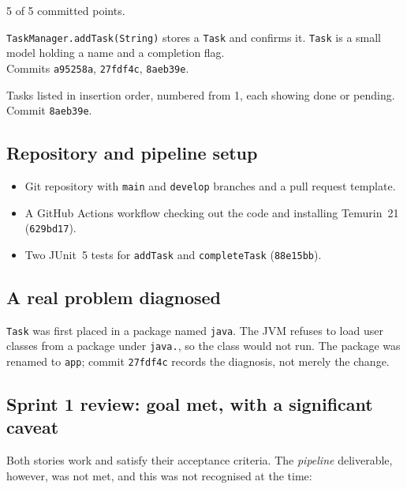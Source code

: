 \documentclass[11pt,a4paper]{article}
\newcommand{\code}[1]{\texttt{\small #1}}
\begin{document}
5 of 5 committed points.

\begin{description}[leftmargin=0pt,style=nextline]
  \item[US1 --- Add a task] \code{TaskManager.addTask(String)} stores a
    \code{Task} and confirms it. \code{Task} is a small model holding a name and
    a completion flag. \\ Commits \code{a95258a}, \code{27fdf4c}, \code{8aeb39e}.
  \item[US2 --- View tasks] Tasks listed in insertion order, numbered from 1,
    each showing done or pending. \\ Commit \code{8aeb39e}.
\end{description}

\subsection{Repository and pipeline setup}

\begin{itemize}
  \item Git repository with \code{main} and \code{develop} branches and a pull
        request template.
  \item A GitHub Actions workflow checking out the code and installing
        Temurin~21 (\code{629bd17}).
  \item Two JUnit~5 tests for \code{addTask} and \code{completeTask}
        (\code{88e15bb}).
\end{itemize}

\subsection{A real problem diagnosed}

\code{Task} was first placed in a package named \code{java}. The JVM refuses to
load user classes from a package under \code{java.}, so the class would not run.
The package was renamed to \code{app}; commit \code{27fdf4c} records the
diagnosis, not merely the change.

\subsection{Sprint 1 review: goal met, with a significant caveat}

Both stories work and satisfy their acceptance criteria. The \emph{pipeline}
deliverable, however, was not met, and this was not recognised at the time:
\end{document}
